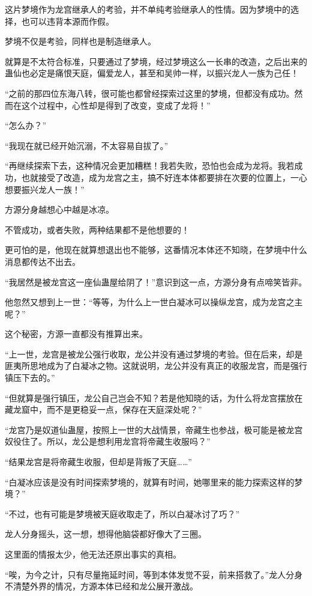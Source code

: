 \begin{this_body}
这片梦境作为龙宫继承人的考验，并不单纯考验继承人的性情。因为梦境中的选择，也可以违背本源而作假。

梦境不仅是考验，同样也是制造继承人。

就算是不太符合标准，只要通过了梦境，经过梦境这么一长串的改造，之后出来的蛊仙也必定是痛恨天庭，偏爱龙人，甚至和吴帅一样，以振兴龙人一族为己任！

“之前的那四位东海八转，很可能也都曾经探索过这里的梦境，但都没有成功。然而在这个过程中，心性却是得到了改变，变成了龙将！”

“怎么办？”

“我现在就已经开始沉溺，不太容易自拔了。”

“再继续探索下去，这种情况会更加糟糕！我若失败，恐怕也会成为龙将。我若成功，也就接受了改造，成为龙宫之主，搞不好连本体都要排在次要的位置上，一心想要振兴龙人一族！”

方源分身越想心中越是冰凉。

不管成功，或者失败，两种结果都不是他想要的！

更可怕的是，他现在就算想退出也不能够，这番情况本体还不知晓，在梦境中什么消息都传达不出去。

“我居然是被龙宫这一座仙蛊屋给阴了！”意识到这一点，方源分身有点啼笑皆非。

他忽然又想到上一世：“等等，为什么上一世白凝冰可以操纵龙宫，成为龙宫之主呢？”

这个秘密，方源一直都没有推算出来。

“上一世，龙宫是被龙公强行收取，龙公并没有通过梦境的考验。但在后来，却是匪夷所思地成为了白凝冰之物。这就说明，龙公并没有真正的收服龙宫，而是强行镇压下去的。”

“但就算是强行镇压，龙公自己岂会不知？若是他知晓的话，为什么将龙宫摆放在藏龙窟中，而不是更稳妥一点，保存在天庭深处呢？”

“龙宫乃是奴道仙蛊屋，按照上一世的大战情景，帝藏生也参战，极可能是被龙宫奴役住了。所以，龙公是想利用龙宫将帝藏生收服吗？”

“结果龙宫是将帝藏生收服，但却是背叛了天庭……”

“白凝冰应该是没有时间探索梦境的，就算有时间，她哪里来的能力探索这样的梦境？”

“不过，也有可能是梦境被天庭收取走了，所以白凝冰讨了巧？”

龙人分身摇头，这一想，想得他脑袋都好像大了三圈。

这里面的情报太少，他无法还原出事实的真相。

“唉，为今之计，只有尽量拖延时间，等到本体发觉不妥，前来搭救了。”龙人分身不清楚外界的情况，方源本体已经和龙公展开激战。


\end{this_body}

